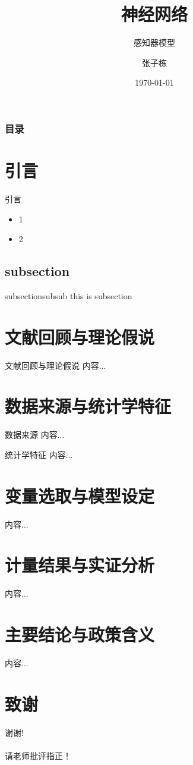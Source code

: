 \documentclass{beamer}
\author[张子栋]{张子栋}
\title[神经网络]{神经网络}
\subtitle{感知器模型}
\institute[HZAU]{华中农业大学
	
	信息学院}
\date[\today]{\today}
\begin{document}
	\kaishu
	
	\frame{\titlepage}
	
	\begin{frame}
		\frametitle{目录}
		\tableofcontents
	\end{frame}
	
	\section{引言}
	\begin{frame}{引言}
		\begin{itemize}
			\item 1
			\item 2
		\end{itemize}
	\end{frame}

	\subsection{subsection}
	\begin{frame}{subsection}{subsub}
		this is subsection
	\end{frame}

	\section{文献回顾与理论假说}
	\begin{frame}{文献回顾与理论假说}
		内容...
	\end{frame}
	
	\section{数据来源与统计学特征}
	\begin{frame}{数据来源}
		内容...
	\end{frame}
	\begin{frame}{统计学特征}
		内容...
	\end{frame}

	\section{变量选取与模型设定}
	\begin{frame}{}
		内容...
	\end{frame}

	\section{计量结果与实证分析}
	\begin{frame}{}
		内容...
	\end{frame}

	\section{主要结论与政策含义}
	\begin{frame}{}
		内容...
	\end{frame}
	
	\section*{致谢}  
	\begin{frame}
		\begin{center}
			\textcolor{myNewColorA}{\huge {谢谢!\\ \quad \\ 请老师批评指正！}}
		\end{center}
	\end{frame}
	
\end{document}
